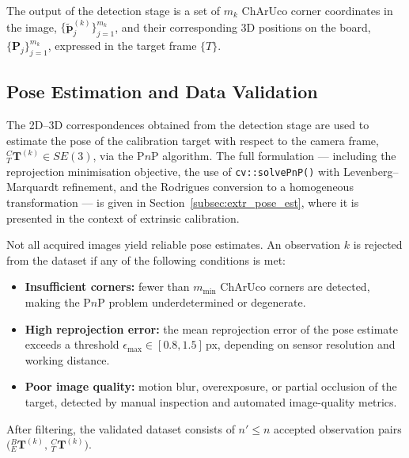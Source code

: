 The output of the detection stage is a set of $m_k$ ChArUco corner
coordinates in the image, $\{\tilde{\mathbf{p}}_j^{(k)}\}_{j=1}^{m_k}$,
and their corresponding 3D positions on the board,
$\{\mathbf{P}_j\}_{j=1}^{m_k}$, expressed in the target frame $\{T\}$.

\subsection{Pose Estimation and Data Validation}
\label{subsec:pose_est_filtering}

The 2D--3D correspondences obtained from the detection stage are used to
estimate the pose of the calibration target with respect to the camera frame,
${}^C_T\mathbf{T}^{(k)} \in SE(3)$, via the P$n$P algorithm. The full
formulation — including the reprojection minimisation objective, the use of
\texttt{cv::solvePnP()} with Levenberg--Marquardt refinement, and the
Rodrigues conversion to a homogeneous transformation — is given in
Section~\ref{subsec:extr_pose_est}, where it is presented in the context of
extrinsic calibration.

Not all acquired images yield reliable pose estimates. An observation $k$ is
rejected from the dataset if any of the following conditions is met:

\begin{itemize}
	\item \textbf{Insufficient corners:} fewer than $m_{\min}$ ChArUco corners
	are detected, making the P$n$P problem underdetermined or degenerate.
	
	\item \textbf{High reprojection error:} the mean reprojection error of the
	pose estimate exceeds a threshold $\epsilon_{\max} \in [0.8, 1.5]$\,px, depending on sensor resolution and
	working distance.
	
	\item \textbf{Poor image quality:} motion blur, overexposure, or partial
	occlusion of the target, detected by manual inspection and automated
	image-quality metrics.
\end{itemize}

\noindent After filtering, the validated dataset consists of $n' \leq n$
accepted observation pairs $\bigl({}^B_E\mathbf{T}^{(k)},\,
{}^C_T\mathbf{T}^{(k)}\bigr)$.

